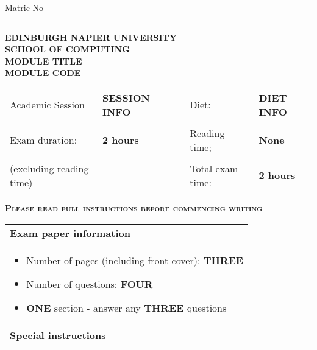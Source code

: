 \documentclass[12pt, a4paper, twosize]{article}
\newcommand{\blank}[1]{\hspace*{#1}}
\newcommand*{\inputline}[1][3em]{\rule[0.5ex]{#1}{0.55pt}}
\begin{document}
\begin{titlepage}
\vspace*{0.2cm}

Matric No \inputline[10em]

\begin{center}

\textsc{ {\bf{EDINBURGH NAPIER UNIVERSITY}}}\\[0.5cm]
\textsc{ {\bf{SCHOOL OF COMPUTING}}}\\[1.1cm]


\textsc{ {\bf{MODULE TITLE}}}\\[1cm]
\textsc{ {\bf{MODULE CODE}}}\\[1.5cm]

\end{center}

\begin{table}[H]
\centering
\begin{tabular}{lllll}
Academic Session         & \textbf{SESSION INFO} &  \blank{1cm} & Diet:& \textbf{DIET INFO}   \\
     & & & \\
Exam duration:           & \textbf{2 hours} &  & Reading time;    & \textbf{None}    \\
     & & & \\
(excluding reading time) &                  &  & Total exam time: & \textbf{2 hours}
\end{tabular}
\end{table}

\vspace{1.8cm}
\textsc{{\bf{Please read full instructions before commencing writing}}}

\begin{table}[H]
\centering
\begin{tabular}{|p{14cm}|}
\hline

{\bf{Exam paper information}}\\[-0.5cm]

    \begin{itemize}
      \item Number of pages (including front cover): {\bf{THREE}}
      \item Number of questions: {\bf{FOUR}}
      \item {\bf{ONE}} section - answer any {\bf{THREE}} questions
    \end{itemize} \\[-0.5cm]

\hline
{\bf{Special instructions}}\\[-0.5cm]


\end{tabular}
\end{table}
\end{titlepage}
\end{document}
